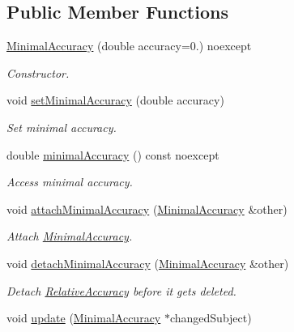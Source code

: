 \subsection*{Public Member Functions}
\begin{DoxyCompactItemize}
\item 
\hyperlink{classSpacy_1_1Mixin_1_1MinimalAccuracy_a9dc80f566f27efbd48c43c7f7c0961c2_a9dc80f566f27efbd48c43c7f7c0961c2}{Minimal\+Accuracy} (double accuracy=0.) noexcept
\begin{DoxyCompactList}\small\item\em Constructor. \end{DoxyCompactList}\item 
void \hyperlink{classSpacy_1_1Mixin_1_1MinimalAccuracy_a34d3d3320bba45d5c6c06b65e2cc808b_a34d3d3320bba45d5c6c06b65e2cc808b}{set\+Minimal\+Accuracy} (double accuracy)
\begin{DoxyCompactList}\small\item\em Set minimal accuracy. \end{DoxyCompactList}\item 
double \hyperlink{classSpacy_1_1Mixin_1_1MinimalAccuracy_ab9e4346b7070ce179593fc38d556705b_ab9e4346b7070ce179593fc38d556705b}{minimal\+Accuracy} () const noexcept
\begin{DoxyCompactList}\small\item\em Access minimal accuracy. \end{DoxyCompactList}\item 
void \hyperlink{classSpacy_1_1Mixin_1_1MinimalAccuracy_a0b2039bf970afdb0ede9999d6567f49b_a0b2039bf970afdb0ede9999d6567f49b}{attach\+Minimal\+Accuracy} (\hyperlink{classSpacy_1_1Mixin_1_1MinimalAccuracy}{Minimal\+Accuracy} \&other)
\begin{DoxyCompactList}\small\item\em Attach \hyperlink{classSpacy_1_1Mixin_1_1MinimalAccuracy}{Minimal\+Accuracy}. \end{DoxyCompactList}\item 
\hypertarget{classSpacy_1_1Mixin_1_1MinimalAccuracy_adb422b74482cdef5ffaff816da86b18d}{}void \hyperlink{classSpacy_1_1Mixin_1_1MinimalAccuracy_adb422b74482cdef5ffaff816da86b18d}{detach\+Minimal\+Accuracy} (\hyperlink{classSpacy_1_1Mixin_1_1MinimalAccuracy}{Minimal\+Accuracy} \&other)\label{classSpacy_1_1Mixin_1_1MinimalAccuracy_adb422b74482cdef5ffaff816da86b18d}

\begin{DoxyCompactList}\small\item\em Detach \hyperlink{classSpacy_1_1Mixin_1_1RelativeAccuracy}{Relative\+Accuracy} before it gets deleted. \end{DoxyCompactList}\item 
\hypertarget{classSpacy_1_1Mixin_1_1MinimalAccuracy_a98dc7eb03f50165f6f2e0df17c2b7d44}{}void \hyperlink{classSpacy_1_1Mixin_1_1MinimalAccuracy_a98dc7eb03f50165f6f2e0df17c2b7d44}{update} (\hyperlink{classSpacy_1_1Mixin_1_1MinimalAccuracy}{Minimal\+Accuracy} $\ast$changed\+Subject)\label{classSpacy_1_1Mixin_1_1MinimalAccuracy_a98dc7eb03f50165f6f2e0df17c2b7d44}


\end{DoxyCompactItemize}
